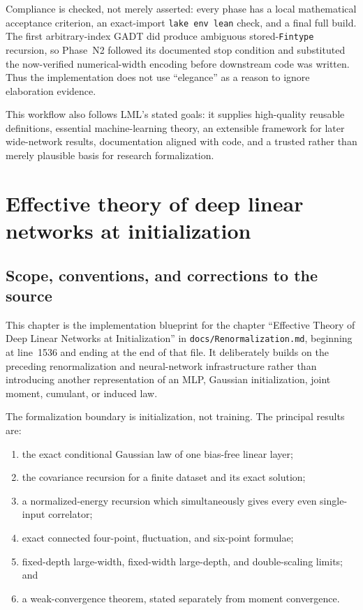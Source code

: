 Compliance is checked, not merely asserted: every phase has a local mathematical acceptance
criterion, an exact-import \texttt{lake env lean} check, and a final full build.  The first
arbitrary-index GADT did produce ambiguous stored-\texttt{Fintype} recursion, so Phase~N2 followed
its documented stop condition and substituted the now-verified numerical-width encoding before
downstream code was written.  Thus the implementation does not use ``elegance'' as a reason to
ignore elaboration evidence.

This workflow also follows LML's stated goals: it supplies high-quality reusable definitions,
essential machine-learning theory, an extensible framework for later wide-network results,
documentation aligned with code, and a trusted rather than merely plausible basis for research
formalization.


\chapter{Effective theory of deep linear networks at initialization}
\label{chap:deep-linear-renormalization}

\section{Scope, conventions, and corrections to the source}

This chapter is the implementation blueprint for the chapter ``Effective Theory of Deep Linear
Networks at Initialization'' in \texttt{docs/Renormalization.md}, beginning at line~1536 and ending
at the end of that file.  It deliberately builds on the preceding renormalization and neural-network
infrastructure rather than introducing another representation of an MLP, Gaussian initialization,
joint moment, cumulant, or induced law.

The formalization boundary is initialization, not training.  The principal results are:
\begin{enumerate}
  \item the exact conditional Gaussian law of one bias-free linear layer;
  \item the covariance recursion for a finite dataset and its exact solution;
  \item a normalized-energy recursion which simultaneously gives every even single-input
    correlator;
  \item exact connected four-point, fluctuation, and six-point formulae;
  \item fixed-depth large-width, fixed-width large-depth, and double-scaling limits; and
  \item a weak-convergence theorem, stated separately from moment convergence.
\end{enumerate}

